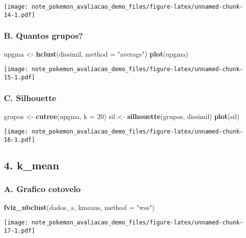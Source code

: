 \documentclass[]{article}
\newenvironment{Shaded}{\begin{snugshade}}{\end{snugshade}}
\newcommand{\DataTypeTok}[1]{\textcolor[rgb]{0.13,0.29,0.53}{#1}}
\newcommand{\DecValTok}[1]{\textcolor[rgb]{0.00,0.00,0.81}{#1}}
\newcommand{\KeywordTok}[1]{\textcolor[rgb]{0.13,0.29,0.53}{\textbf{#1}}}
\newcommand{\NormalTok}[1]{#1}
\newcommand{\StringTok}[1]{\textcolor[rgb]{0.31,0.60,0.02}{#1}}
\begin{document}
\texttt{[image: note\_pokemon\_avaliacao\_demo\_files/figure-latex/unnamed-chunk-14-1.pdf]}

\hypertarget{b.-quantos-grupos-1}{%
\subsubsection{B. Quantos grupos?}\label{b.-quantos-grupos-1}}

\begin{Shaded}
\begin{Highlighting}[]
\NormalTok{upgma <-}\StringTok{ }\KeywordTok{hclust}\NormalTok{(dissimil, }\DataTypeTok{method =} \StringTok{"average"}\NormalTok{)}
\KeywordTok{plot}\NormalTok{(upgma)}
\end{Highlighting}
\end{Shaded}

\texttt{[image: note\_pokemon\_avaliacao\_demo\_files/figure-latex/unnamed-chunk-15-1.pdf]}

\hypertarget{c.-silhouette-1}{%
\subsubsection{C. Silhouette}\label{c.-silhouette-1}}

\begin{Shaded}
\begin{Highlighting}[]
\NormalTok{grupos <-}\StringTok{ }\KeywordTok{cutree}\NormalTok{(upgma, }\DataTypeTok{k =} \DecValTok{20}\NormalTok{)}
\NormalTok{sil <-}\StringTok{ }\KeywordTok{silhouette}\NormalTok{(grupos, dissimil)}
\KeywordTok{plot}\NormalTok{(sil)}
\end{Highlighting}
\end{Shaded}

\texttt{[image: note\_pokemon\_avaliacao\_demo\_files/figure-latex/unnamed-chunk-16-1.pdf]}

\hypertarget{k_mean}{%
\subsection{4. k\_mean}\label{k_mean}}

\hypertarget{a.-grafico-cotovelo-2}{%
\subsubsection{A. Grafico cotovelo}\label{a.-grafico-cotovelo-2}}

\begin{Shaded}
\begin{Highlighting}[]
\KeywordTok{fviz_nbclust}\NormalTok{(dados_s, kmeans, }\DataTypeTok{method =} \StringTok{"wss"}\NormalTok{)}
\end{Highlighting}
\end{Shaded}

\texttt{[image: note\_pokemon\_avaliacao\_demo\_files/figure-latex/unnamed-chunk-17-1.pdf]}
\end{document}
